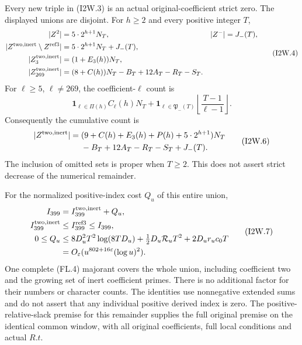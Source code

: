 \begin{theorem}
\label{AC-G183-window}
Every new triple in (I2W.3) is an actual original-coefficient strict
zero.  The displayed unions are disjoint.  For $h\geq2$ and every
positive integer $T$,
\[
 \begin{aligned}
 |Z^2|&=5\cdot2^{h+1}N_T,& |Z^-|&=J_-(T),\\
 |Z^{\rm two,inert}\setminus Z^{\rm ref3}|
       &=5\cdot2^{h+1}N_T+J_-(T),\\
 |Z^{\rm two,inert}_3|&=(1+E_3(h))N_T,\\
 |Z^{\rm two,inert}_{269}|&=(8+C(h))N_T-B_T+12A_T-R_T-S_T.
 \end{aligned}\tag{I2W.4}
\]
For $\ell\geq5$, $\ell\ne269$, the coefficient-$\ell$ count is
\[
 \mathbf1_{\ell\in\Pi(h)}C_\ell(h)N_T+
 \mathbf1_{\ell\in\mathfrak P_-(T)}
                        \left\lfloor\frac{T-1}{\ell-1}\right\rfloor.
 \tag{I2W.5}
\]
Consequently the cumulative count is
\[
 \begin{split}
 |Z^{\rm two,inert}|={}&
  (9+C(h)+E_3(h)+P(h)+5\cdot2^{h+1})N_T\\
 &-B_T+12A_T-R_T-S_T+J_-(T).
 \end{split}\tag{I2W.6}
\]
The inclusion of omitted sets is proper when $T\geq2$.
This does not assert strict decrease of the numerical remainder.

For the normalized positive-index cost $Q_u$ of this entire union,
\[
 \begin{aligned}
 I_{399}&=I_{399}^{\rm two,inert}+Q_u,\\
 I_{399}^{\rm two,inert}&\leq I_{399}^{\rm ref3}\leq I_{399},\\
 0\leq Q_u&\leq8D_u^2T^2\log(8TD_u)
          +\tfrac12D_u\mathcal R_uT^2+2D_ur_uc_0T\\
 &=O_\varepsilon(u^{802+16\varepsilon}(\log u)^2).
 \end{aligned}\tag{I2W.7}
\]
One complete (FL.4) majorant covers the whole union, including
coefficient two and the growing set of inert coefficient primes.
There is no additional factor for their numbers or character counts.
The identities use nonnegative extended sums and do not assert
that any individual positive derived index is zero.
The positive-relative-slack premise for this remainder supplies
the full original premise on the identical common window, with
all original coefficients, full local conditions and actual $R.t$.
\end{theorem}

